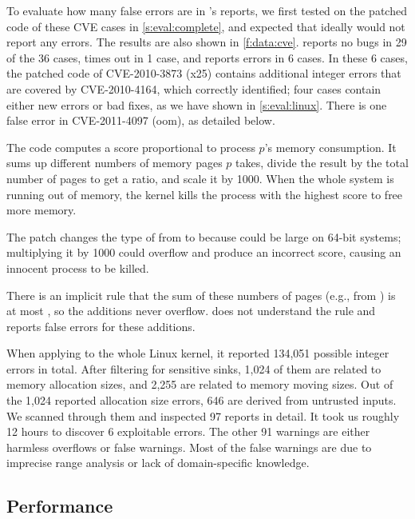 To evaluate how many false errors are in \sys's reports,
we first tested \sys on the patched code of these CVE cases
in \autoref{s:eval:complete},
and expected that ideally \sys would not report any errors.
The results are also shown in \autoref{f:data:cve}.
\sys reports no bugs in 29 of the 36 cases, times out in 1 case, and
reports errors in 6 cases.
%
In these 6 cases,
the patched code of CVE-2010-3873 (x25)
contains additional integer errors that are covered by CVE-2010-4164,
which \sys correctly identified;
four cases contain either new errors or bad fixes,
as we have shown in \autoref{s:eval:linux}.
There is one false error in CVE-2011-4097 (oom), as detailed below.


The code
computes a score proportional to process $p$'s memory consumption.
It sums up different numbers of
memory pages $p$ takes, divide the result by the total number
of pages to get a ratio, and scale it by 1000.
When the whole system is running out of memory,
the kernel kills the process with the highest score
to free more memory.

The patch changes the type of  from  to  because
 could be large on 64-bit systems; multiplying it by
1000 could overflow and produce an incorrect score,
causing an innocent process to be killed.

There is an implicit rule that the sum of these numbers of pages
(e.g., from ) is at most , so the
additions never overflow.  \sys does not understand the rule and
reports false errors for these additions.

When applying \sys to the whole Linux kernel, it reported 134,051 possible
integer errors in total. After filtering for sensitive sinks, 1,024 of them are
related to memory allocation sizes, and 2,255 are related to memory moving
sizes.  Out of the 1,024 reported allocation size errors, 646 are derived from
untrusted inputs.  We scanned through them and inspected 97 reports in detail.
It took us roughly 12 hours to discover 6 exploitable errors.
The other 91 warnings are either harmless overflows or false warnings.  Most of
the false warnings are due to imprecise range analysis or lack of
domain-specific knowledge.


\subsection{Performance}
\label{s:eval:perf}


